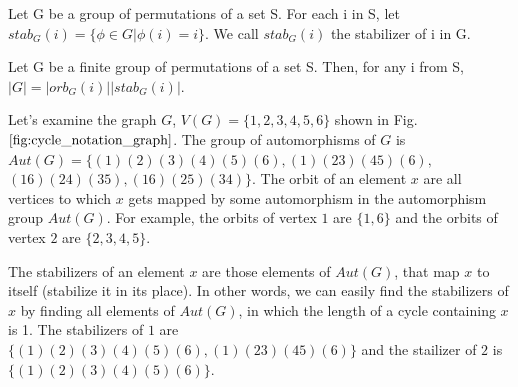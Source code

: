 \begin{definition}
Let G be a group of permutations of a set S. For each i in S, let $stab_G(i) = \{ \phi \in G | \phi(i) = i \}$. We call $stab_G(i)$ the stabilizer of i in G.
\end{definition}

\begin{definition}
\label{def:group_order}
Let G be a finite group of permutations of a set S. Then, for any i from S, $|G| = |orb_G(i)| |stab_G(i)|$.
\end{definition}

Let's examine the graph $G$, $V(G) = \{1, 2, 3, 4, 5, 6\}$ shown in Fig. $\ref{fig:cycle_notation_graph}$. The group of automorphisms of $G$ is $Aut(G) = \{ (1)(2)(3)(4)(5)(6), (1)(23)(45)(6),$ $(16)(24)(35), (16)(25)(34) \}$. The orbit of an element $x$ are all vertices to which $x$ gets mapped by some automorphism in the automorphism group $Aut(G)$. For example, the orbits of vertex $1$ are $\{ 1, 6 \}$ and the orbits of vertex $2$ are $\{ 2, 3, 4, 5 \}$.

The stabilizers of an element $x$ are those elements of $Aut(G)$, that map $x$ to itself (stabilize it in its place). In other words, we can easily find the stabilizers of $x$ by finding all elements of $Aut(G)$, in which the length of a cycle containing $x$ is 1. The stabilizers of $1$ are $\{ (1)(2)(3)(4)(5)(6), (1)(23)(45)(6) \}$ and the stailizer of $2$ is $\{(1)(2)(3)(4)(5)(6)\}$.

